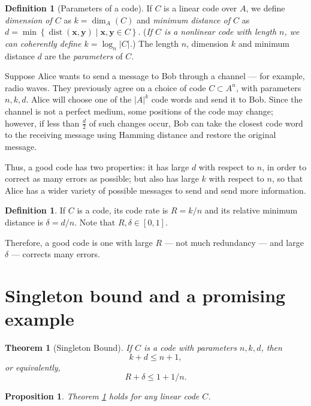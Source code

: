 \documentclass[11pt, letterpaper]{amsart}
\newtheorem{thm}[]{Theorem}
\newtheorem{prop}[thm]{Proposition}
\theoremstyle{definition}
\newtheorem{defn}[]{Definition}
\DeclareMathOperator{\dist}{dist}
\begin{document}
\begin{defn}[Parameters of a code]
    If $C$ is a linear code over $A$, we define \emph{dimension of $C$} as $k = \dim_A(C)$ and \emph{minimum distance of $C$} as $d = \min\left\{\dist(\mathbf{x}, \mathbf{y}) \mid \mathbf{x}, \mathbf{y} \in C\right\}$. (\emph{If $C$ is a nonlinear code with length $n$, we can coherently define $k = \log_n{\left|C\right|}$.}) The length $n$, dimension $k$ and minimum distance $d$ are the \emph{parameters} of $C$.
\end{defn}

Suppose Alice wants to send a message to Bob through a channel --- for example, radio waves. They previously agree on a choice of code $C \subset A^n$, with parameters $n, k, d$. Alice will choose one of the $|A|^k$ code words and send it to Bob. Since the channel is not a perfect medium, some positions of the code may change; however, if less than $\frac{d}{2}$ of such changes occur, Bob can take the closest code word to the receiving message using Hamming distance and restore the original message.

Thus, a good code has two properties: it has large $d$ with respect to $n$, in order to correct as many errors as possible; but also has large $k$ with respect to $n$, so that Alice has a wider variety of possible messages to send and send more information.

\begin{defn}
    If $C$ is a code, its code rate is $R = k/n$ and its relative minimum distance is $\delta = d/n$. Note that $R, \delta \in [0, 1]$.
\end{defn}

Therefore, a good code is one with large $R$ --- not much redundancy --- and large $\delta$ --- corrects many errors. 

\section{Singleton bound and a promising example} \label{s:singleton}
\begin{thm}[Singleton Bound]\label{thm:singleton_bound}
If $C$ is a code with parameters $n, k, d$, then \[k + d \le n + 1,\] or equivalently, \[R + \delta \le 1 + 1/n.\]
\end{thm}

\begin{prop}
Theorem \ref{thm:singleton_bound} holds for any linear code $C$.
\end{prop}
\end{document}
